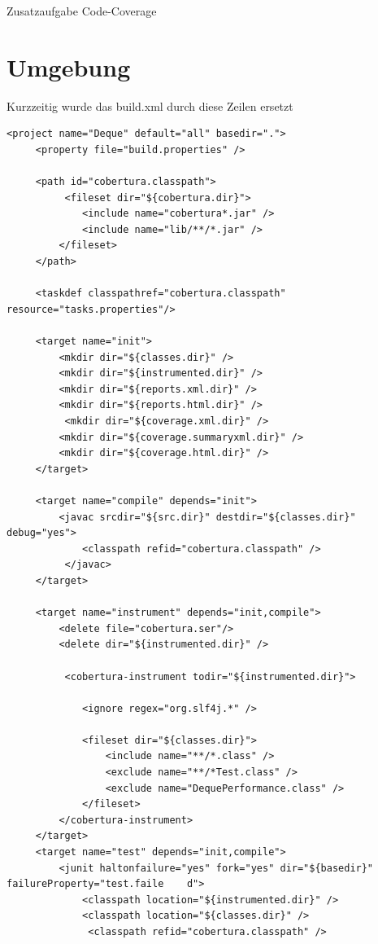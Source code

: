 \documentclass[a4paper,11pt]{scrartcl}
\begin{document}
\begin{center}
{\LARGE Zusatzaufgabe Code-Coverage}
\end{center}

\section{Umgebung}
Kurzzeitig wurde das build.xml durch diese Zeilen ersetzt
\begin{lstlisting}
<project name="Deque" default="all" basedir=".">
     <property file="build.properties" />
 
     <path id="cobertura.classpath">
          <fileset dir="${cobertura.dir}">
             <include name="cobertura*.jar" />
             <include name="lib/**/*.jar" />
         </fileset>
     </path>
 
     <taskdef classpathref="cobertura.classpath" resource="tasks.properties"/>
 
     <target name="init">
         <mkdir dir="${classes.dir}" />
         <mkdir dir="${instrumented.dir}" />
         <mkdir dir="${reports.xml.dir}" />
         <mkdir dir="${reports.html.dir}" />
          <mkdir dir="${coverage.xml.dir}" />
         <mkdir dir="${coverage.summaryxml.dir}" />
         <mkdir dir="${coverage.html.dir}" />
     </target>
 
     <target name="compile" depends="init">
         <javac srcdir="${src.dir}" destdir="${classes.dir}" debug="yes">
             <classpath refid="cobertura.classpath" />
          </javac>
     </target>
 
     <target name="instrument" depends="init,compile">
         <delete file="cobertura.ser"/>
         <delete dir="${instrumented.dir}" />
 
          <cobertura-instrument todir="${instrumented.dir}">
              
             <ignore regex="org.slf4j.*" />
 
             <fileset dir="${classes.dir}">
                 <include name="**/*.class" />
                 <exclude name="**/*Test.class" />
                 <exclude name="DequePerformance.class" />
             </fileset>
         </cobertura-instrument>
     </target>
     <target name="test" depends="init,compile">
         <junit haltonfailure="yes" fork="yes" dir="${basedir}" failureProperty="test.faile    d">
             <classpath location="${instrumented.dir}" />
             <classpath location="${classes.dir}" />
              <classpath refid="cobertura.classpath" />
 

\end{lstlisting}
\end{document}
